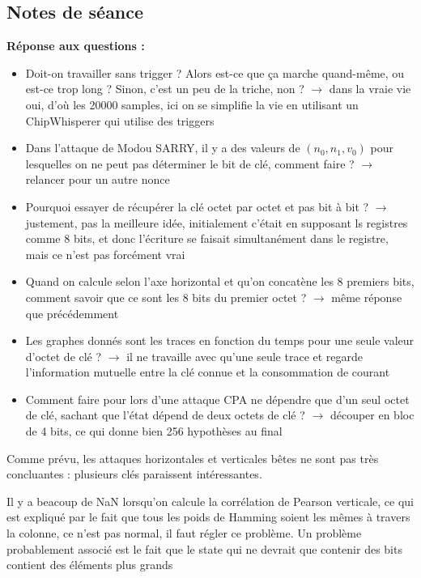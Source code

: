 \documentclass[12pt]{article}
\begin{document}
	\subsection{Notes de séance}
	\textbf{Réponse aux questions :}
	\begin{itemize}
		\item Doit-on travailler sans trigger ? Alors est-ce que ça marche quand-même, ou est-ce trop long ? Sinon, c'est un peu de la triche, non ? $\rightarrow$ dans la vraie vie oui, d'où les 20000 samples, ici on se simplifie la vie en utilisant un ChipWhisperer qui utilise des triggers
		\item Dans l'attaque de Modou SARRY, il y a des valeurs de $(n_0,n_1,v_0)$ pour lesquelles on ne peut pas déterminer le bit de clé, comment faire ? $\rightarrow$ relancer pour un autre nonce
		\item Pourquoi essayer de récupérer la clé octet par octet et pas bit à bit ? $\rightarrow$ justement, pas la meilleure idée, initialement c'était en supposant ls registres comme 8 bits, et donc l'écriture se faisait simultanément dans le registre, mais ce n'est pas forcément vrai
		\item Quand on calcule selon l'axe horizontal et qu'on concatène les 8 premiers bits, comment savoir que ce sont les 8 bits du premier octet ? $\rightarrow$ même réponse que précédemment
		\item Les graphes donnés sont les traces en fonction du temps pour une seule valeur d'octet de clé ? $\rightarrow$ il ne travaille avec qu'une seule trace et regarde l'information mutuelle entre la clé connue et la consommation de courant
		\item Comment faire pour lors d'une attaque CPA ne dépendre que d'un seul octet de clé, sachant que l'état dépend de deux octets de clé ? $\rightarrow$ découper en bloc de 4 bits, ce qui donne bien 256 hypothèses au final
	\end{itemize}
	
	\noindent Comme prévu, les attaques horizontales et verticales bêtes ne sont pas très concluantes : plusieurs clés paraissent intéressantes.
	
	\noindent Il y a beacoup de NaN lorsqu'on calcule la corrélation de Pearson verticale, ce qui est expliqué par le fait que tous les poids de Hamming soient les mêmes à travers la colonne, ce n'est pas normal, il faut régler ce problème. Un problème probablement associé est le fait que le state qui ne devrait que contenir des bits contient des éléments plus grands
	
\end{document}
